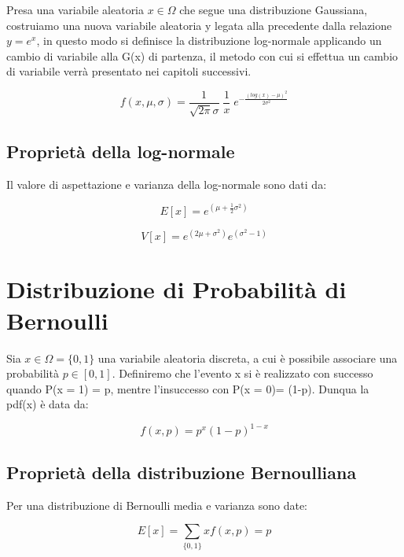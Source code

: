 Presa una variabile aleatoria $x \in \Omega $ che segue una distribuzione Gaussiana, costruiamo una nuova variabile aleatoria y legata alla precedente dalla relazione $y = e^x$, in questo modo si definisce la distribuzione log-normale applicando un cambio di variabile alla G(x) di partenza, il metodo con cui si effettua un cambio di variabile verr\`{a} presentato nei capitoli successivi.

\begin{equation*}
	f(x,\mu,\sigma) = \dfrac{1}{\sqrt{2\pi}\sigma}\;\dfrac{1}{x}\; e^{-\frac{(log(x)-\mu)^2}{2\sigma^2}}
\end{equation*} 

\subsection{Propriet\`{a} della log-normale}

Il valore di aspettazione e varianza della log-normale sono dati da:

\begin{equation}
	E[x] = e^{(\mu + \frac{1}{2}\sigma^2)}
\end{equation}

\begin{equation}
	V[x] = e^{(2\mu + \sigma^2)}e^{(\sigma^2-1)}
\end{equation}

\section{Distribuzione di Probabilit\`{a} di Bernoulli}

Sia $x \in \Omega = \{0,1\}$ una variabile aleatoria discreta, a cui \`{e} possibile associare una probabilit\`{a} $p \in [0,1]$. Definiremo che l'evento x si \`{e} realizzato con successo quando P(x = 1) = p, mentre l'insuccesso con P(x = 0)= (1-p). Dunqua la pdf(x) \`{e} data da:

\begin{equation*}
	f(x,p) = p^x(1-p)^{1-x}
\end{equation*}

\subsection{Propriet\`{a} della distribuzione Bernoulliana}

Per una distribuzione di Bernoulli media e varianza sono date:

\begin{equation}
	E[x] = \sum_{\{0,1\}}xf(x,p) = p
\end{equation}

